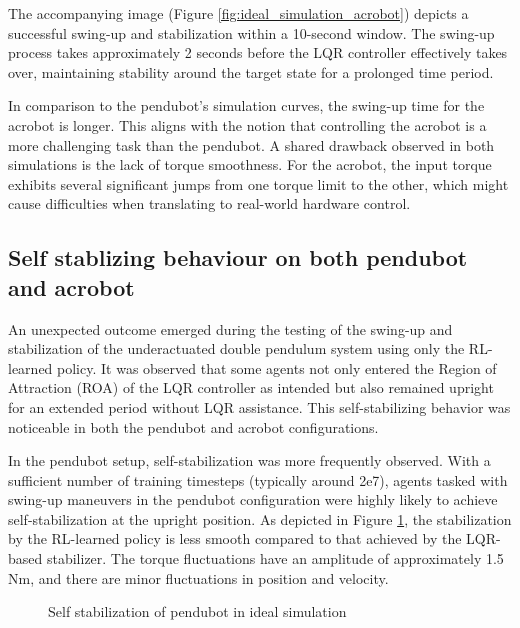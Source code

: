 The accompanying image (Figure \ref{fig:ideal_simulation_acrobot}) depicts a successful swing-up and stabilization within a 10-second window. The swing-up process takes approximately 2 seconds before the LQR controller effectively takes over, maintaining stability around the target state for a prolonged time period.

In comparison to the pendubot's simulation curves, the swing-up time for the acrobot is longer. This aligns with the notion that controlling the acrobot is a more challenging task than the pendubot. A shared drawback observed in both simulations is the lack of torque smoothness. For the acrobot, the input torque exhibits several significant jumps from one torque limit to the other, which might cause difficulties when translating to real-world hardware control.

\subsection{Self stablizing behaviour on both pendubot and acrobot}
An unexpected outcome emerged during the testing of the swing-up and stabilization of the underactuated double pendulum system using only the RL-learned policy. It was observed that some agents not only entered the Region of Attraction (ROA) of the LQR controller as intended but also remained upright for an extended period without LQR assistance. This self-stabilizing behavior was noticeable in both the pendubot and acrobot configurations.

In the pendubot setup, self-stabilization was more frequently observed. With a sufficient number of training timesteps (typically around 2e7), agents tasked with swing-up maneuvers in the pendubot configuration were highly likely to achieve self-stabilization at the upright position. As depicted in Figure \ref{fig:pendubot_self_stabilization}, the stabilization by the RL-learned policy is less smooth compared to that achieved by the LQR-based stabilizer. The torque fluctuations have an amplitude of approximately 1.5 Nm, and there are minor fluctuations in position and velocity.
\begin{figure}[H]
    \centering
    \caption{Self stabilization of pendubot in ideal simulation}
    \label{fig:pendubot_self_stabilization}
\end{figure}

